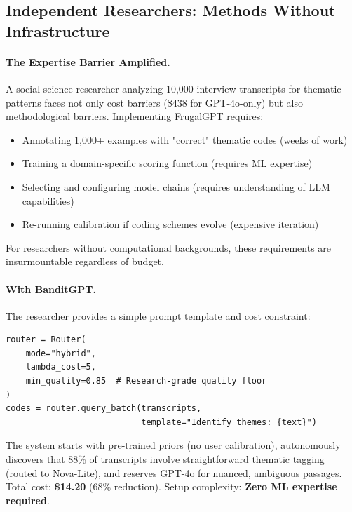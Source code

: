 \subsection{Independent Researchers: Methods Without Infrastructure}

\paragraph{The Expertise Barrier Amplified.} A social science researcher analyzing 10,000 interview transcripts for thematic patterns faces not only cost barriers (\$438 for GPT-4o-only) but also methodological barriers. Implementing FrugalGPT requires:
\begin{itemize}[leftmargin=*,nosep]
    \item Annotating 1,000+ examples with "correct" thematic codes (weeks of work)
    \item Training a domain-specific scoring function (requires ML expertise)
    \item Selecting and configuring model chains (requires understanding of LLM capabilities)
    \item Re-running calibration if coding schemes evolve (expensive iteration)
\end{itemize}

For researchers without computational backgrounds, these requirements are insurmountable regardless of budget.

\paragraph{With BanditGPT.} The researcher provides a simple prompt template and cost constraint:

\begin{small}
\begin{verbatim}
router = Router(
    mode="hybrid", 
    lambda_cost=5,
    min_quality=0.85  # Research-grade quality floor
)
codes = router.query_batch(transcripts, 
                           template="Identify themes: {text}")
\end{verbatim}
\end{small}

The system starts with pre-trained priors (no user calibration), autonomously discovers that 88\% of transcripts involve straightforward thematic tagging (routed to Nova-Lite), and reserves GPT-4o for nuanced, ambiguous passages. Total cost: \textbf{\$14.20} (68\% reduction). Setup complexity: \textbf{Zero ML expertise required}.

